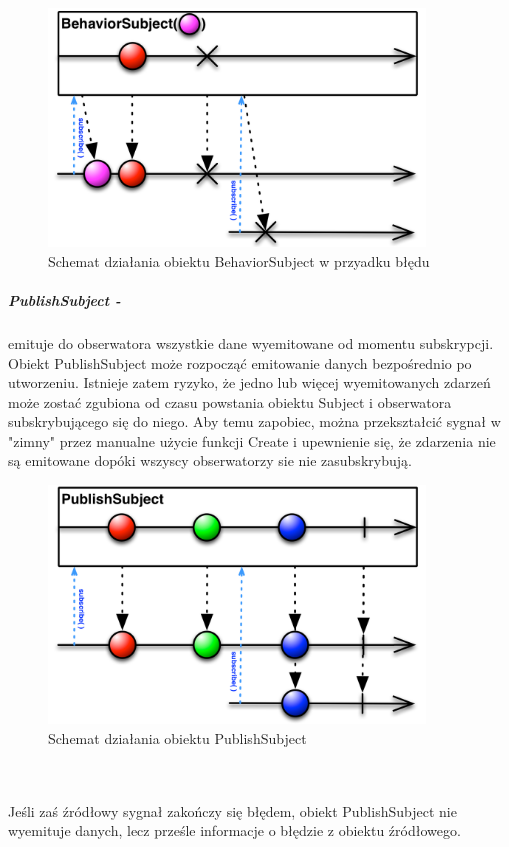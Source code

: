 \documentclass[12pt,oneside,a4paper]{report}
\begin{document}
\begin{figure}[ht!]
	\centering
	\includegraphics[width=10cm]{behaviorSubjectFailed}
	\caption{Schemat działania obiektu BehaviorSubject w przyadku błędu}
	\label{behaviorSubjectFailed}
\end{figure}
\subparagraph{PublishSubject -}emituje do obserwatora wszystkie dane wyemitowane od momentu subskrypcji. Obiekt PublishSubject może rozpocząć emitowanie danych bezpośrednio po utworzeniu. Istnieje zatem ryzyko, że jedno lub więcej wyemitowanych zdarzeń może zostać zgubiona od czasu powstania obiektu Subject i obserwatora subskrybującego się do niego. Aby temu zapobiec, można przekształcić sygnał w "zimny" przez manualne użycie funkcji Create i upewnienie się, że zdarzenia nie są emitowane dopóki wszyscy obserwatorzy sie nie zasubskrybują. 
\begin{figure}[ht!]
	\centering
	\includegraphics[width=10cm]{publishSubject}
	\caption{Schemat działania obiektu PublishSubject}
	\label{publishSubject}
\end{figure}
\\
\\
Jeśli zaś źródłowy sygnał zakończy się błędem, obiekt PublishSubject nie wyemituje danych, lecz prześle informacje o błędzie z obiektu źródłowego.
\end{document}
